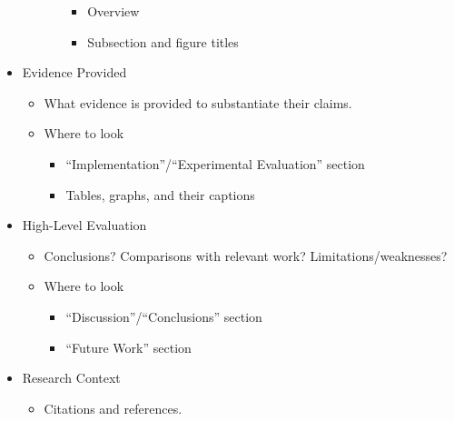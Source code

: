\documentclass{article}
\begin{document}
\begin{itemize}
\begin{itemize}
\begin{itemize}
\begin{itemize}
                \item Overview
                \item Subsection and figure titles
            \end{itemize}
        \end{itemize}
    \end{itemize}
    \item Evidence Provided
    \begin{itemize}
        \item What evidence is provided to substantiate their claims.
        \item Where to look
        \begin{itemize}
            \item ``Implementation''/``Experimental Evaluation'' section
            \item Tables, graphs, and their captions
        \end{itemize}
    \end{itemize}
    \item High-Level Evaluation
    \begin{itemize}
        \item Conclusions? Comparisons with relevant work? Limitations/weaknesses?
        \item Where to look
        \begin{itemize}
            \item ``Discussion''/``Conclusions'' section
            \item ``Future Work'' section
        \end{itemize}
    \end{itemize}
    \item Research Context
    \begin{itemize}
        \item Citations and references.
    \end{itemize}
\end{itemize}
\end{document}
